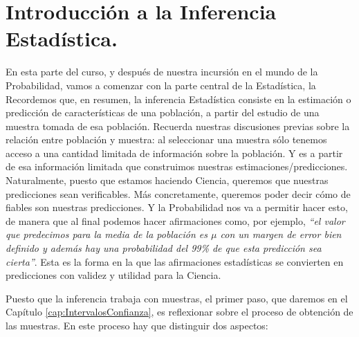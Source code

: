 
\section*{Introducción a la Inferencia Estadística.}
\label{part03:intro}


En esta parte del curso, y después de nuestra incursión en el mundo de la Probabilidad, vamos a comenzar con la parte central de la Estadística, la  Recordemos que, en resumen, la inferencia Estadística consiste en la estimación o predicción de características de una población, a partir del estudio de una muestra tomada de esa población. Recuerda nuestras discusiones previas sobre la relación entre población y muestra: al seleccionar una muestra sólo tenemos acceso a una cantidad limitada de información sobre la población. Y es a partir de esa información limitada que construimos nuestras estimaciones/predicciones. Naturalmente, puesto que estamos haciendo Ciencia, queremos que nuestras predicciones sean verificables. Más concretamente, queremos poder decir cómo de fiables son nuestras predicciones. Y la Probabilidad nos va a permitir hacer esto, de manera que al final podemos hacer afirmaciones como, por ejemplo, {\em ``el valor que predecimos para la media de la población es $\mu$ {\sf con un margen de error bien definido y además hay una probabilidad del 99\% de que esta predicción sea cierta}''}. Esta es la forma en la que las afirmaciones estadísticas se convierten en predicciones con validez y utilidad para la Ciencia.

Puesto que la inferencia trabaja con muestras, el primer paso, que daremos en el Capítulo \ref{cap:IntervalosConfianza}, es reflexionar sobre el proceso de obtención de las muestras. En este proceso hay que distinguir dos aspectos:

